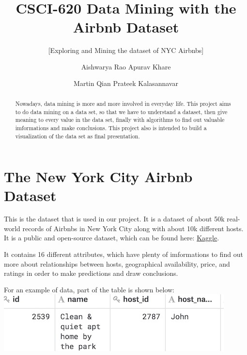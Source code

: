 \documentclass{sig-alternate}
\begin{document}
\title{CSCI-620 Data Mining with the Airbnb Dataset}
\subtitle{[Exploring and Mining the dataset of NYC Airbnbs]}

\author
{
\alignauthor
  Aishwarya Rao
\alignauthor
  Apurav Khare
\and
\alignauthor
  Martin Qian
\alignauthor
  Prateek Kalasannavar
}

\maketitle
\begin{abstract}
Nowadays, data mining is more and more involved in everyday life. 
This project aims to do data mining on a data set, so that we have to understand a dataset, 
then give meaning to every value in the data set, finally with algorithms to find out valuable imformations and make conclusions. 
This project also is intended to build a visualization of the data set as final presentation.

\end{abstract}


\section{The New York City Airbnb Dataset}
This is the dataset that is used in our project. It is a dataset 
of about 50k real-world records of Airbnbs in New York City along with about 10k different hosts. 
It is a public and open-source dataset, which can be found here: \href{https://www.kaggle.com/dgomonov/new-york-city-airbnb-open-data}{Kaggle}.

It contains 16 different attributes, which have plenty of imformations to find out more about relationships between 
hosts, geographical availability, price, and ratings in order to make predictions and draw conclusions.

For an example of data, part of the table is shown below:
\includegraphics{table_sample.png}
\end{document}
